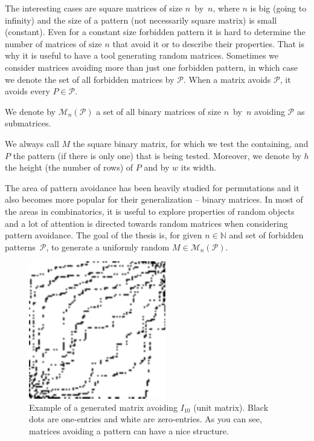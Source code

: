 The interesting cases are square matrices of size $n$~by~$n$, where $n$ is big (going to infinity) and the size of a pattern (not necessarily square matrix) is small (constant). Even for a constant size forbidden pattern it is hard to determine the number of matrices of size $n$ that avoid it or to describe their properties. That is why it is useful to have a tool generating random matrices. Sometimes we consider matrices avoiding more than just one forbidden pattern, in which case we denote the set of all forbidden matrices by $\mathcal{P}$. When a matrix avoids $\mathcal{P}$, it avoids every $P\in\mathcal{P}$. 
\begin{ntn}
We denote by $\mathcal{M}_n(\mathcal{P})$ a set of all binary matrices of size $n$~by~$n$ avoiding $\mathcal{P}$ as submatrices.
\end{ntn}
\begin{ntn}
We always call $M$ the square binary matrix, for which we test the containing, and $P$ the pattern (if there is only one) that is being tested. Moreover, we denote by $h$ the height (the number of rows) of $P$ and by $w$ its width.
\end{ntn}
The area of pattern avoidance has been heavily studied for permutations and it also becomes more popular for their generalization -- binary matrices. In most of the areas in combinatorics, it is useful to explore properties of random objects and a lot of attention is directed towards random matrices when considering pattern avoidance. The goal of the thesis is, for given $n\in\mathbb{N}$ and set of forbidden patterns~$\mathcal{P}$, to generate a uniformly random $M\in\mathcal{M}_n(\mathcal{P})$.
\begin{figure}[h!]
\centering
\includegraphics[width=60mm]{../img/walking-diag.pdf}
\caption{Example of a generated matrix avoiding $I_{10}$ (unit matrix). Black dots are one-entries and white are zero-entries. As you can see, matrices avoiding a pattern can have a nice structure.}
\label{avoiding}
\end{figure}
